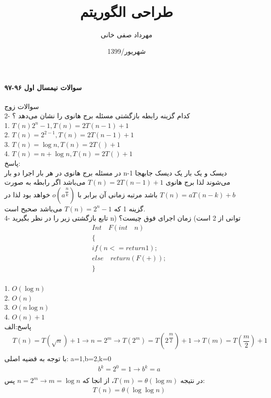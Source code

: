 \documentclass[10pt,a4paper]{article}
\begin{document}
	\title{طراحی الگوریتم}
	\date{1399/شهریور}
	\author{مهرداد صفی خانی}
	\maketitle
	\newpage
	\paragraph{سوالات نیمسال اول ۹۶-۹۷}
سوالات زوج\\

2- کدام گزینه رابطه بازگشتی مسئله برج هانوی را نشان می‌دهد ؟\\
1. $T(n)2^n -1,T(n)=2T(n-1)+1$\\
2. $T(n)=2^{2-1},T(n)=2T(n-1)+1$\\
3. $T(n)=\log n ,T(n)=2T()+1$\\
4. $T(n)=n+\log n,T(n)=2T()+1$\\

پاسخ:\\
در مسئله برج هانوی در هر بار اجرا دو بار n-1 دیسک و یک بار یک دیسک جا‌بهجا می‌شوند لذا برج هانوی $T(n)=2T(n-1)+1$  می‌باشد اگر رابطه به صورت $T(n)=aT(n-k)+b$ باشد مرتبه زمانی آن برابر با $o(a^{\dfrac{n}{k}})$ خواهد بود لذا در گزینه 1 که $T(n)=2^n -1$ می‌باشد صحیح است.\\

4- تابع بازگشتی زیر را در نظر بگیرید n) توانی از 2 است) زمان اجرای فوق چیست؟\\
\begin{align*}
&Int \quad F(int\quad n )\\
&\{\\
&if (n<= return 1);\\
&else \quad return (F(+));\\
&\}\\
\end{align*}

1. $O(\log n)$\\
2. $O(n)$\\
3. $O(n\log n)$ \\
4. $O(n)+1$\\

پاسخ:الف
\begin{align*}
&T(n)=T(\sqrt{n})+1 \to n=2^m \to T(2^m)=T(2^{\dfrac{m}{2}})+1 \to T(m)=T(\dfrac{m}{2})+1\\
\end{align*}
با توجه به قضیه اصلی: a=1,b=2,k=0 \\
\begin{align*}
&b^k=2^0=1\to b^k=a\\
\end{align*}
در نتیجه $T(m)=\theta (\log m)$، از انجا که $n=2^m \to m=\log n$ پس:
\begin{align*}
&T(n)=\theta (\log \log n)\\
\end{align*}
\end{document}
